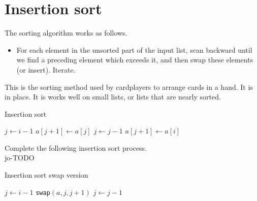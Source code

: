 \chapter{Insertion sort} %
\label{sec:insertionsort}
The sorting algorithm  works as follows.
\begin{itemize}
	\item  For each element in the unsorted part of the input list, scan backward 
	until we find a preceding element which exceeds it, and then swap these 
	elements (or insert). Iterate.
\end{itemize}
This is the sorting method used by cardplayers to arrange cards in a hand.
It is in place. It is works well on small lists, or lists that are nearly sorted.

\begin{algorithm}[H]
  \caption{Insertion sort
    \label{alg:insort}}
\begin{algorithmic}[1]
\State $j \gets i - 1$
\State {}
\State $a[j+1] \gets a[j]$
\State $j \gets j - 1$
\EndWhile
\State $a[j+1] \gets a[i]$ 
\EndFor
\State {}
\EndFunction  
\end{algorithmic}
\end{algorithm}

\begin{Boxample}[0]
Complete the following insertion sort process.\\
jo-TODO
\end{Boxample}

\begin{algorithm}[H]
  \caption{Insertion sort swap version
    \label{alg:insort2}}
\begin{algorithmic}[1]
\State $j \gets i - 1$
\State {}
\State \texttt{swap}$(a,j,j+1)$
\State $j \gets j - 1$
\EndWhile
\EndFor
\State {}
\EndFunction  
\end{algorithmic}
\end{algorithm}


